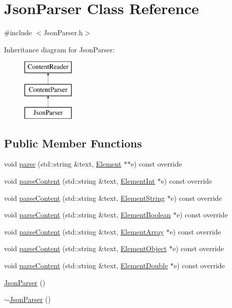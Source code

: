 \hypertarget{classJsonParser}{}\section{Json\+Parser Class Reference}
\label{classJsonParser}


{\ttfamily \#include $<$Json\+Parser.\+h$>$}

Inheritance diagram for Json\+Parser\+:\begin{figure}[H]
\begin{center}
\leavevmode
\includegraphics[height=3.000000cm]{classJsonParser}
\end{center}
\end{figure}
\subsection*{Public Member Functions}
\begin{DoxyCompactItemize}
\item 
void \mbox{\hyperlink{classJsonParser_a3ec3a9fcc8a63f987b4749d60b0568df}{parse}} (std\+::string \&text, \mbox{\hyperlink{classElement}{Element}} $\ast$$\ast$e) const override
\item 
void \mbox{\hyperlink{classJsonParser_ac80cf84ff2565f4c1f3a0f5ddb559c96}{parse\+Content}} (std\+::string \&text, \mbox{\hyperlink{classElementInt}{Element\+Int}} $\ast$e) const override
\item 
void \mbox{\hyperlink{classJsonParser_a94737a7518f05e4ed43a753f4148b354}{parse\+Content}} (std\+::string \&text, \mbox{\hyperlink{classElementString}{Element\+String}} $\ast$e) const override
\item 
void \mbox{\hyperlink{classJsonParser_a0857f5d286e5f0b973e2791e5e7a4e83}{parse\+Content}} (std\+::string \&text, \mbox{\hyperlink{classElementBoolean}{Element\+Boolean}} $\ast$e) const override
\item 
void \mbox{\hyperlink{classJsonParser_aa728c443b247b83cdf6cedb406d8940d}{parse\+Content}} (std\+::string \&text, \mbox{\hyperlink{classElementArray}{Element\+Array}} $\ast$e) const override
\item 
void \mbox{\hyperlink{classJsonParser_a7d4fad0f0947a74ca158dc1922c97355}{parse\+Content}} (std\+::string \&text, \mbox{\hyperlink{classElementObject}{Element\+Object}} $\ast$e) const override
\item 
void \mbox{\hyperlink{classJsonParser_a07a4f2b10547d5f2251bc1f7b09d02c1}{parse\+Content}} (std\+::string \&text, \mbox{\hyperlink{classElementDouble}{Element\+Double}} $\ast$e) const override
\item 
\mbox{\hyperlink{classJsonParser_af21abdfb0ceac731e44d897a0285f5d4}{Json\+Parser}} ()
\item 
\mbox{\hyperlink{classJsonParser_a7c0393b54c37f9ff30b6bb59f0ba92ce}{$\sim$\+Json\+Parser}} ()
\end{DoxyCompactItemize}


